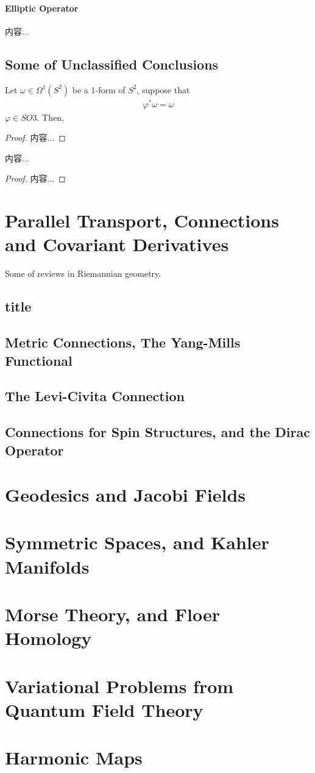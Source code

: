\documentclass[Total.tex]{subfiles}
\begin{document}
				\subsubsection{Elliptic Operator}
				\begin{Def}
					内容...
				\end{Def}
		\section{Some of Unclassified Conclusions}
			\begin{proposition}
				Let $\omega\in \Omega^1(S^2)$ be a 1-form of $S^2$, suppose that
				\begin{gather*}
					\varphi^*\omega=\omega
				\end{gather*}
				$\varphi\in SO3$. Then, 
			\end{proposition}
			\begin{proof}
				内容...
			\end{proof}
			
			\begin{proposition}
				内容...
			\end{proposition}
			\begin{proof}
				内容...
			\end{proof}
			
	\chapter{Parallel Transport, Connections and Covariant Derivatives}
		Some of reviews in Riemannian geometry.
		\section{title}
		\section{Metric Connections, The Yang-Mills Functional}
		\section{The Levi-Civita Connection}
		\section{Connections for Spin Structures, and the Dirac Operator}
	\chapter{Geodesics and Jacobi Fields}
	\chapter{Symmetric Spaces, and Kahler Manifolds}
	\chapter{Morse Theory, and Floer Homology}
	\chapter{Variational Problems from Quantum Field Theory}
	\chapter{Harmonic Maps}
\end{document}

